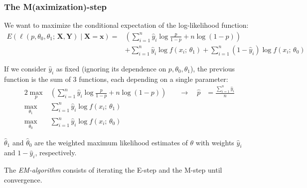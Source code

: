 \subsubsection{The M(aximization)-step}
We want to maximize the conditional expectation of the log-likelihood function:
\begin{align*}
    E \left(\ell(p,\theta_0,\theta_1;\,\boldsymbol{X},\boldsymbol{Y}) \mid \boldsymbol{X}=\boldsymbol{x} \right)
    = & \left(
        \sum_{i=1}^n \hat{y}_i \log \frac{p}{1-p} + n \log (1 - p)
        \right) \\
      & + \sum_{i=1}^n \hat{y}_i \log f(x_i;\,\theta_1) + \sum_{i=1}^n (1 - \hat{y}_i) \log f(x_i;\,\theta_0)
\end{align*}

If we consider $\hat{y}_i$ as fixed (ignoring its dependence on $p, \theta_0, \theta_1$), the
previous function is the sum of 3 functions, each depending on a single parameter:
\begin{alignat*}{2}
    \max_{p}&\left( \sum_{i=1}^n \hat{y}_i \log \frac{p}{1-p} + n \log (1 - p) \right) & \quad \rightarrow{} \quad
    \hat{p} & = \frac{\sum_{i=1}^n \hat{y}_i}{n} \\
    \max_{\theta_1}&\sum_{i=1}^n \hat{y}_i \log f(x_i;\,\theta_1) \\
    \max_{\theta_0}&\sum_{i=1}^n \hat{y}_i \log f(x_i;\,\theta_0)
\end{alignat*}

$\hat{\theta}_1$ and $\hat{\theta}_0$ are the weighted maximum likelihood estimates
of $\theta$ with weights $\hat{y}_i$ and $1 - \hat{y}_i$, respectively.

\begin{marker}
    The \emph{EM-algorithm} consists of iterating the E-step and the M-step until convergence.
\end{marker}

